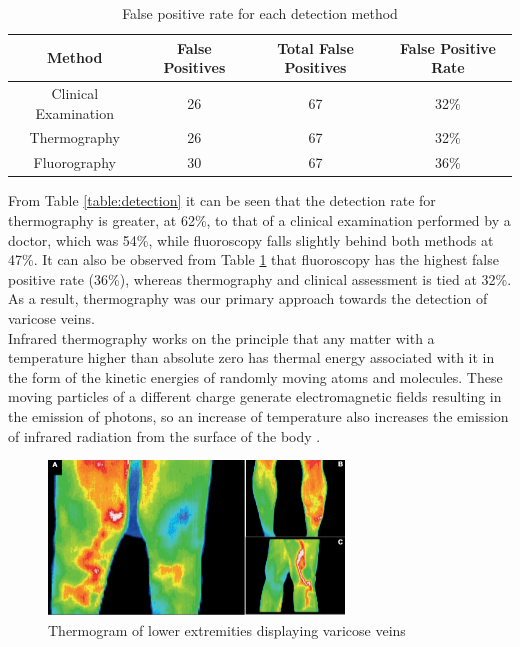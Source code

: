 \documentclass[11.5pt]{article}
\begin{document}
\begin{table}[H]
	\centering
	\caption{False positive rate for each detection method \cite{Gunn}}
	\vspace{3mm}
	\begin{tabular}{cccc}
	\hline
		Method & False Positives & Total False Positives & False Positive Rate \\
	\hline
        Clinical Examination & 26 & 67 & 32\% \\
        Thermography & 26 & 67 & 32\% \\
        Fluorography & 30 & 67 & 36\%\\
	\hline 
		\end{tabular}
		\label{table:fpv}
\end{table}

From Table \ref{table:detection} it can be seen that the detection rate for thermography is greater, at 62\%, to that of a clinical examination performed by a doctor, which was 54\%, while fluoroscopy falls slightly behind both methods at 47\%. It can also be observed from Table \ref{table:fpv} that fluoroscopy has the highest false positive rate (36\%), whereas thermography and clinical assessment is tied at 32\%. As a result, thermography was our primary approach towards the detection of varicose veins.\\

Infrared thermography works on the principle that any matter with a temperature higher than absolute zero has thermal energy associated with it in the form of the kinetic energies of randomly moving atoms and molecules. These moving particles of a different charge generate electromagnetic ﬁelds resulting in the emission of photons, so an increase of temperature also increases the emission of infrared radiation from the surface of the body \cite{Shaydakov}.

\begin{figure}[H]
    \centering
    \includegraphics[width=0.7\textwidth]{litreview/thermograph.PNG}
    \caption{Thermogram of lower extremities displaying varicose veins \cite{Shaydakov}}
    \label{fig:vv_thermo}
\end{figure}
\end{document}

